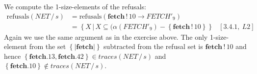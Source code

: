 \documentclass[11pt,a4paper]{article}
\def\ra{\rightarrow}
\def\ch{\,|\,}
\def\wr{\,!\,}
\def\after{\,/\,}
\newcommand{\refusals}[1]{\text{refusals}\left ( #1 \right )}
\newcommand{\chan}[1]{\textbf{#1}}
\newcommand{\sN}[1]{\left \lbrace #1 \right \rbrace}
\newcommand{\abs}[1]{\left | #1 \right |}
\begin{document}
We compute the 1-size-elements of the refusals:
\begin{align*}
    \refusals{NET \after s} &= \refusals{\chan{fetch}\wr 10 \ra FETCH'_9} \\
    &= \sN{ X \ch X \subseteq (\alpha(FETCH'_9) - \sN{\chan{fetch}\wr 10}}
        & [3.4.1,~L2]
\end{align*}
Again we use the same argument as in the exercise above. The only 1-size-element
from the set $\sN{\abs{\chan{fetch}}}$ subtracted from the refusal set is
$\chan{fetch}\wr 10$ and hence $\sN{\chan{fetch}.13,\chan{fetch}.42} \in
traces(NET \after s)$ and $\sN{\chan{fetch}.10} \not \in traces(NET \after s)$.
\end{document}

